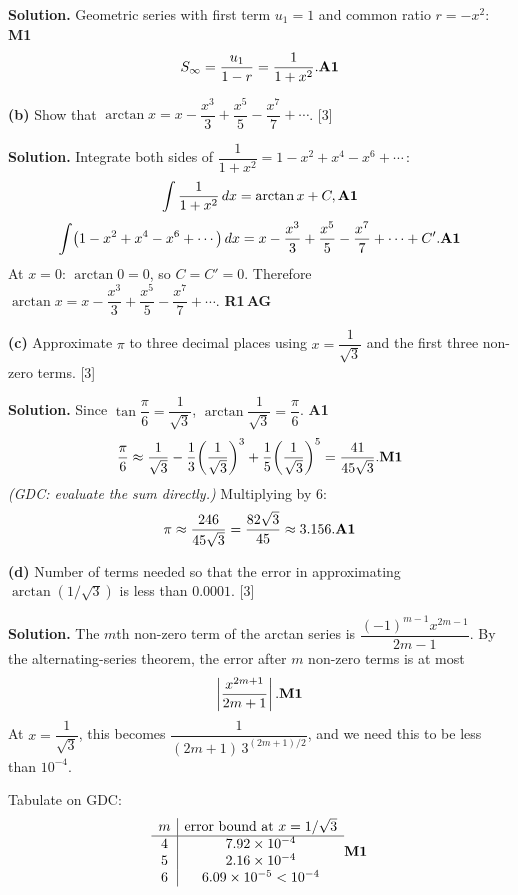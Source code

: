 \documentclass[12pt, twoside]{article}
\begin{document}
\begin{enumerate}[itemsep=0.3cm]
\textbf{Solution.} Geometric series with first term $u_1 = 1$ and common
ratio $r = -x^2$: \hfill \textbf{M1}
\[
S_{\infty} = \frac{u_1}{1 - r} = \frac{1}{1 + x^2}. \hfill \textbf{A1}
\]

\medskip

\textbf{(b)} Show that
$\arctan x = x - \dfrac{x^3}{3} + \dfrac{x^5}{5} - \dfrac{x^7}{7} + \cdots$.
\hfill [3]

\textbf{Solution.} Integrate both sides of
$\dfrac{1}{1 + x^2} = 1 - x^2 + x^4 - x^6 + \cdots$\,:
\[
\int \frac{1}{1 + x^2}\, dx = \arctan x + C, \hfill \textbf{A1}
\]
\[
\int \!\left(1 - x^2 + x^4 - x^6 + \cdots\right) dx
= x - \frac{x^3}{3} + \frac{x^5}{5} - \frac{x^7}{7} + \cdots + C'. \hfill \textbf{A1}
\]
At $x = 0$: $\arctan 0 = 0$, so $C = C' = 0$. Therefore
$\arctan x = x - \dfrac{x^3}{3} + \dfrac{x^5}{5} - \dfrac{x^7}{7} + \cdots$.
\hfill \textbf{R1\,AG}

\medskip

\textbf{(c)} Approximate $\pi$ to three decimal places using
$x = \dfrac{1}{\sqrt{3}}$ and the first three non-zero terms.
\hfill [3]

\textbf{Solution.} Since $\tan\dfrac{\pi}{6} = \dfrac{1}{\sqrt{3}}$,
$\arctan\dfrac{1}{\sqrt{3}} = \dfrac{\pi}{6}$. \hfill \textbf{A1}
\[
\frac{\pi}{6} \approx \frac{1}{\sqrt{3}} - \frac{1}{3}\!\left(\frac{1}{\sqrt{3}}\right)^{3}
+ \frac{1}{5}\!\left(\frac{1}{\sqrt{3}}\right)^{5}
= \frac{41}{45\sqrt{3}}. \hfill \textbf{M1}
\]
\textit{(GDC: evaluate the sum directly.)} Multiplying by $6$:
\[
\pi \approx \frac{246}{45\sqrt{3}} = \frac{82\sqrt{3}}{45} \approx 3.156.
\hfill \textbf{A1}
\]

\medskip

\textbf{(d)} Number of terms needed so that the error in approximating
$\arctan(1/\sqrt{3})$ is less than $0.0001$. \hfill [3]

\textbf{Solution.} The $m$th non-zero term of the arctan series is
$\dfrac{(-1)^{m-1} x^{2m-1}}{2m - 1}$. By the alternating-series theorem,
the error after $m$ non-zero terms is at most
\[
\left|\frac{x^{2m+1}}{2m + 1}\right|. \hfill \textbf{M1}
\]
At $x = \dfrac{1}{\sqrt{3}}$, this becomes
$\dfrac{1}{(2m+1)\, 3^{(2m+1)/2}}$, and we need this to be less than
$10^{-4}$.

Tabulate on GDC:
\[
\begin{array}{c|c}
m & \text{error bound at } x = 1/\sqrt{3} \\ \hline
4 & 7.92 \times 10^{-4} \\
5 & 2.16 \times 10^{-4} \\
6 & 6.09 \times 10^{-5} < 10^{-4}
\end{array}
\hfill \textbf{M1}
\]


\end{enumerate}
\end{document}
